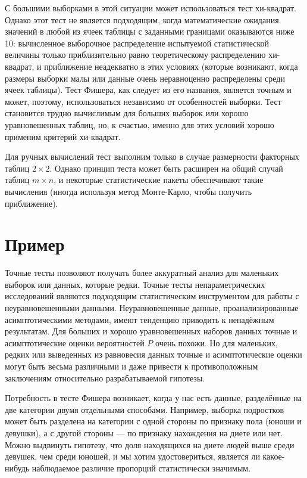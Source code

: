 С большими выборками в этой ситуации может использоваться тест хи-квадрат. Однако этот тест не является подходящим, когда математические ожидания значений в любой из ячеек таблицы с заданными границами оказываются ниже 10: вычисленное выборочное распределение испытуемой статистической величины только приблизительно равно теоретическому распределению хи-квадрат, и приближение неадекватно в этих условиях (которые возникают, когда размеры выборки малы или данные очень неравноценно распределены среди ячеек таблицы). Тест Фишера, как следует из его названия, является точным и может, поэтому, использоваться независимо от особенностей выборки. Тест становится трудно вычислимым для больших выборок или хорошо уравновешенных таблиц, но, к счастью, именно для этих условий хорошо применим критерий хи-квадрат.

Для ручных вычислений тест выполним только в случае размерности факторных таблиц $2 \times 2$. Однако принцип теста может быть расширен на общий случай таблиц $m \times n$, и некоторые статистические пакеты обеспечивают такие вычисления (иногда используя метод Монте-Карло, чтобы получить приближение).

\section*{Пример}

Точные тесты позволяют получать более аккуратный анализ для маленьких выборок или данных, которые редки. Точные тесты непараметрических исследований являются подходящим статистическим инструментом для работы с неуравновешенными данными. Неуравновешенные данные, проанализированные асимптотическими методами, имеют тенденцию приводить к ненадёжным результатам. Для больших и хорошо уравновешенных наборов данных точные и асимптотические оценки вероятностей $P$ очень похожи. Но для маленьких, редких или выведенных из равновесия данных точные и асимптотические оценки могут быть весьма различными и даже привести к противоположным заключениям относительно разрабатываемой гипотезы.

Потребность в тесте Фишера возникает, когда у нас есть данные, разделённые на две категории двумя отдельными способами. Например, выборка подростков может быть разделена на категории с одной стороны по признаку пола (юноши и девушки), а с другой стороны — по признаку нахождения на диете или нет. Можно выдвинуть гипотезу, что доля находящихся на диете людей выше среди девушек, чем среди юношей, и мы хотим удостовериться, является ли какое-нибудь наблюдаемое различие пропорций статистически значимым.


